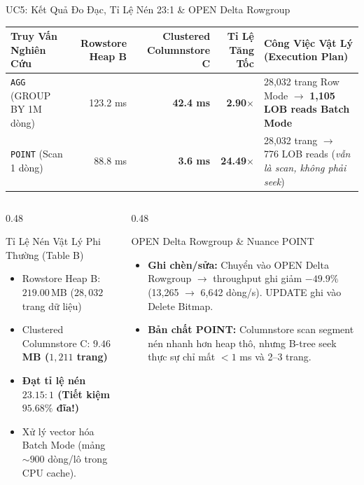 \documentclass[aspectratio=169,9pt]{beamer}
\begin{document}
\begin{frame}{UC5: Kết Quả Đo Đạc, Tỉ Lệ Nén 23:1 \& OPEN Delta Rowgroup}
\begin{table}
\centering\footnotesize
\begin{tabularx}{\linewidth}{@{}l r r r X@{}}
\toprule
\textbf{Truy Vấn Nghiên Cứu} & \textbf{Rowstore Heap B} & \textbf{Clustered Columnstore C} & \textbf{Tỉ Lệ Tăng Tốc} & \textbf{Công Việc Vật Lý (Execution Plan)} \\
\midrule
\texttt{AGG} (GROUP BY 1M dòng) & 123.2 ms & \textbf{42.4 ms} & \textbf{2.90$\times$} & 28,032 trang Row Mode $\to$ \textbf{1,105 LOB reads Batch Mode} \\
\texttt{POINT} (Scan 1 dòng) & 88.8 ms & \textbf{3.6 ms} & \textbf{24.49$\times$} & 28,032 trang $\to$ 776 LOB reads (\emph{vẫn là scan, không phải seek}) \\
\bottomrule
\end{tabularx}
\end{table}

\vspace{-0.2cm}
\begin{columns}[T]
\begin{column}{0.48\textwidth}
\begin{exampleblock}{Tỉ Lệ Nén Vật Lý Phi Thường (Table B)}
\scriptsize
\begin{itemize}
  \item Rowstore Heap B: $219.00$\,MB ($28,032$ trang dữ liệu)
  \item Clustered Columnstore C: \textbf{$9.46$\,MB ($1,211$ trang)}
  \item \textbf{Đạt tỉ lệ nén $23.15 : 1$ (Tiết kiệm $95.68\%$ đĩa!)}
  \item Xử lý vector hóa Batch Mode (mảng $\sim 900$ dòng/lô trong CPU cache).
\end{itemize}
\end{exampleblock}
\end{column}

\begin{column}{0.48\textwidth}
\begin{alertblock}{OPEN Delta Rowgroup \& Nuance POINT}
\scriptsize
\begin{itemize}
  \item \textbf{Ghi chèn/sửa:} Chuyển vào OPEN Delta Rowgroup $\to$ throughput ghi giảm $-49.9\%$ (13,265 $\to$ 6,642 dòng/s). UPDATE ghi vào Delete Bitmap.
  \item \textbf{Bản chất POINT:} Columnstore scan segment nén nhanh hơn heap thô, nhưng B-tree seek thực sự chỉ mất $<1$ ms và 2--3 trang.
\end{itemize}
\end{alertblock}
\end{column}
\end{columns}
\end{frame}
\end{document}
